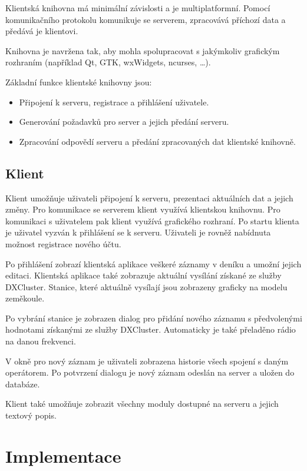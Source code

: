 Klientská knihovna má minimální závislosti a je multiplatformní. Pomocí komunikačního protokolu
komunikuje se serverem, zpracovává příchozí data a předává je klientovi.

Knihovna je navržena tak, aby mohla spolupracovat s jakýmkoliv grafickým
rozhraním (například Qt, GTK, wxWidgets, ncurses, \dots). %

Základní funkce klientské knihovny jsou:

\begin{itemize}
\item Připojení k serveru, registrace a přihlášení uživatele.
\item Generování požadavků pro server a jejich předání serveru.
\item Zpracování odpovědí serveru a předání zpracovaných dat klientské knihovně.
\end{itemize}

\section{Klient}
\label{navrh_klient}

Klient umožňuje uživateli připojení k serveru, prezentaci aktuálních dat a
jejich změny. Pro komunikace
se serverem klient využívá klientskou knihovnu. Pro komunikaci s uživatelem pak klient využívá grafického rozhraní.
Po startu klienta je uživatel vyzván k přihlášení se k serveru. Uživateli je rovněž nabídnuta možnost registrace
nového účtu.

Po přihlášení zobrazí klientská aplikace veškeré záznamy v deníku a umožní jejich editaci. Klientská aplikace také zobrazuje
aktuální vysílání získané ze služby DXCluster. Stanice, které aktuálně vysílají jsou zobrazeny graficky na modelu 
zeměkoule.

Po vybrání stanice je zobrazen dialog pro přidání nového záznamu s předvolenými hodnotami získanými ze služby DXCluster. Automaticky
je také přeladěno rádio na danou frekvenci.

V okně pro nový záznam je uživateli zobrazena historie všech spojení s daným operátorem.
Po potvrzení dialogu je nový záznam odeslán na server a uložen do databáze.

Klient také umožňuje zobrazit všechny moduly dostupné na serveru a jejich
textový popis.


\chapter{Implementace}
\label{implementace}

